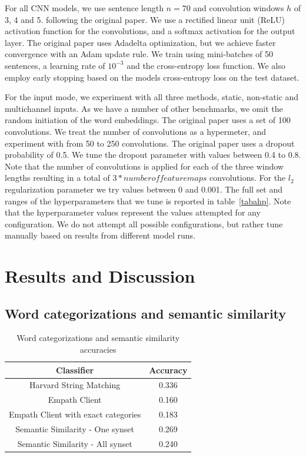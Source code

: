 \documentclass[conference]{IEEEtran}
\begin{document}
For all CNN models, we use sentence length $n = 70$ and convolution windows $h$ of 3, 4 and 5.  following the original paper. We use a rectified linear unit (ReLU) activation function for the convolutions, and a softmax activation for the output layer. The original paper uses Adadelta \cite{adadelta} optimization, but we achieve faster convergence with an Adam \cite{adam} update rule. We train using mini-batches of 50 sentences, a learning rate of $10^{-3}$ and the cross-entropy loss function. We also employ early stopping based on the models cross-entropy loss on the test dataset.

For the input mode, we experiment with all three methods, static, non-static and multichannel inputs. As we have a number of other benchmarks, we omit the random initiation of the word embeddings.  The original paper uses a set of 100 convolutions. We treat the number of convolutions as a hypermeter, and experiment with from 50 to 250 convolutions. The original paper uses a dropout probability of 0.5. We tune the dropout parameter with values between 0.4 to 0.8. Note that the number of convolutions is applied for each of the three window lengths resulting in a total of $3 * number of feature maps$ convolutions. For the $l_2$ regularization parameter we try values between 0 and 0.001. The full set and ranges of the hyperparameters that we tune is reported in table~\ref{tabahp}. Note that the hyperparameter values represent the values attempted for any configuration. We do not attempt all possible configurations, but rather tune manually based on results from different model runs.

\section{Results and Discussion}

\subsection{Word categorizations and semantic similarity}

\begin{table}[htbp]
\caption{Word categorizations and semantic similarity accuracies}
\begin{center}
\begin{tabular}{|c|c|}
\hline
\textbf{Classifier}&\multicolumn{1}{|c|}{\textbf{Accuracy}} \\ 

\hline
Harvard String Matching & 0.336 \\ 
\hline
Empath Client & 0.160 \\ 
\hline
Empath Client with exact categories & 0.183 \\ 
\hline
Semantic Similarity - One synset & 0.269 \\ 
\hline
Semantic Similarity - All synset & 0.240 \\ 
\hline
\end{tabular}
\label{tab1}
\end{center}
\end{table}
\end{document}
